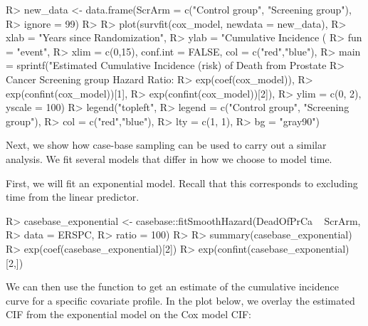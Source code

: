 \documentclass[
]{jss}
\begin{document}
\begin{CodeChunk}

\begin{CodeInput}
R> new_data <- data.frame(ScrArm = c("Control group", "Screening group"),
R>                        ignore = 99)
R> 
R> plot(survfit(cox_model, newdata = new_data),
R>      xlab = "Years since Randomization", 
R>      ylab = "Cumulative Incidence (%
R>      fun = "event",
R>      xlim = c(0,15), conf.int = FALSE, col = c("red","blue"), 
R>      main = sprintf("Estimated Cumulative Incidence (risk) of Death from Prostate 
R>                     Cancer Screening group Hazard Ratio: %
R>                     exp(coef(cox_model)), 
R>                     exp(confint(cox_model))[1], 
R>                     exp(confint(cox_model))[2]),
R>      ylim = c(0, 2), yscale = 100)
R> legend("topleft", 
R>        legend = c("Control group", "Screening group"), 
R>        col = c("red","blue"),
R>        lty = c(1, 1), 
R>        bg = "gray90")
\end{CodeInput}
\end{CodeChunk}

Next, we show how case-base sampling can be used to carry out a similar
analysis. We fit several models that differ in how we choose to model
time.

First, we will fit an exponential model. Recall that this corresponds to
excluding time from the linear predictor.

\begin{CodeChunk}

\begin{CodeInput}
R> casebase_exponential <- casebase::fitSmoothHazard(DeadOfPrCa ~ ScrArm, 
R>                                                   data = ERSPC, 
R>                                                   ratio = 100)
R> 
R> summary(casebase_exponential)
R> exp(coef(casebase_exponential)[2])
R> exp(confint(casebase_exponential)[2,])
\end{CodeInput}
\end{CodeChunk}

We can then use the  function to get an estimate of
the cumulative incidence curve for a specific covariate profile. In the
plot below, we overlay the estimated CIF from the exponential model on
the Cox model CIF:
\end{document}
